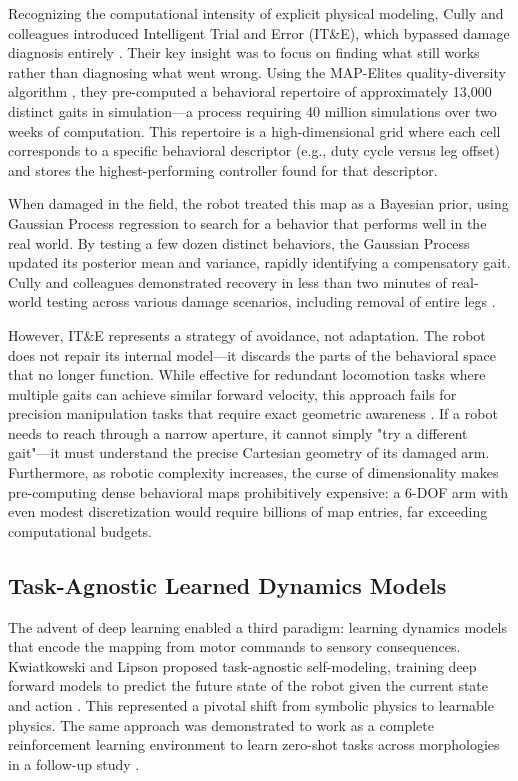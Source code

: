 \documentclass[12pt,a4paper,oneside]{report}
\begin{document}
Recognizing the computational intensity of explicit physical modeling, Cully and colleagues introduced Intelligent Trial and Error (IT\&E), which bypassed damage diagnosis entirely \cite{cully2015robots}. Their key insight was to focus on finding what still works rather than diagnosing what went wrong. Using the MAP-Elites quality-diversity algorithm \cite{mouret2015illuminating}, they pre-computed a behavioral repertoire of approximately 13,000 distinct gaits in simulation—a process requiring 40 million simulations over two weeks of computation. This repertoire is a high-dimensional grid where each cell corresponds to a specific behavioral descriptor (e.g., duty cycle versus leg offset) and stores the highest-performing controller found for that descriptor.

When damaged in the field, the robot treated this map as a Bayesian prior, using Gaussian Process regression to search for a behavior that performs well in the real world. By testing a few dozen distinct behaviors, the Gaussian Process updated its posterior mean and variance, rapidly identifying a compensatory gait. Cully and colleagues demonstrated recovery in less than two minutes of real-world testing across various damage scenarios, including removal of entire legs \cite{cully2015robots}.

However, IT\&E represents a strategy of avoidance, not adaptation. The robot does not repair its internal model—it discards the parts of the behavioral space that no longer function. While effective for redundant locomotion tasks where multiple gaits can achieve similar forward velocity, this approach fails for precision manipulation tasks that require exact geometric awareness \cite{kwiatkowski2019task}. If a robot needs to reach through a narrow aperture, it cannot simply "try a different gait"—it must understand the precise Cartesian geometry of its damaged arm. Furthermore, as robotic complexity increases, the curse of dimensionality makes pre-computing dense behavioral maps prohibitively expensive: a 6-DOF arm with even modest discretization would require billions of map entries, far exceeding computational budgets.

\subsection{Task-Agnostic Learned Dynamics Models}

The advent of deep learning enabled a third paradigm: learning dynamics models that encode the mapping from motor commands to sensory consequences. Kwiatkowski and Lipson proposed task-agnostic self-modeling, training deep forward models to predict the future state of the robot given the current state and action \cite{kwiatkowski2019task}. This represented a pivotal shift from symbolic physics to learnable physics. The same approach was demonstrated to work as a complete reinforcement learning environment to learn zero-shot tasks across morphologies in a follow-up study \cite{kwiatkowski2019zeroshot}.
\end{document}
